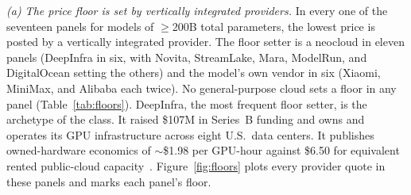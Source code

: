 \documentclass[11pt]{article}
\begin{document}
\emph{(a) The price floor is set by vertically integrated providers.} In
every one of the seventeen panels for models of $\geq$200B total parameters,
the lowest price is posted by a vertically integrated provider. The floor
setter is a neocloud in eleven panels (DeepInfra in six, with Novita,
StreamLake, Mara, ModelRun, and DigitalOcean setting the others) and the
model's own vendor in six (Xiaomi, MiniMax, and Alibaba each twice). No general-purpose cloud sets a
floor in any panel (Table~\ref{tab:floors}). DeepInfra, the most frequent
floor setter, is the archetype of the class. It raised \$107M in Series~B
funding and owns and operates its GPU infrastructure across eight U.S.\ data
centers. It publishes owned-hardware economics of $\sim$\$1.98 per GPU-hour
against \$6.50 for equivalent rented public-cloud capacity~\cite{r12}. Figure~\ref{fig:floors} plots
every provider quote in these panels and marks each panel's floor.
\end{document}
